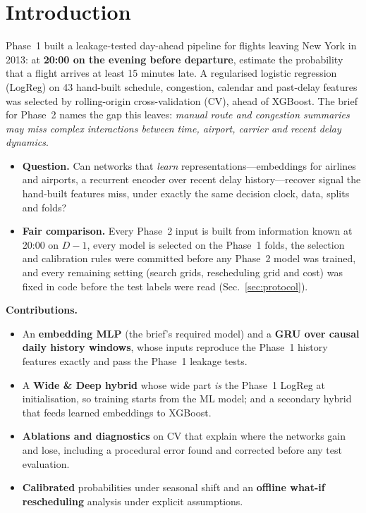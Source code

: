 \documentclass[conference]{IEEEtran}
\begin{document}
\section{Introduction}\label{sec:intro}
Phase~1 built a leakage-tested day-ahead pipeline for flights leaving New York in 2013: at \textbf{20:00 on the evening before departure}, estimate the probability that a flight arrives at least 15 minutes late. A regularised logistic regression (LogReg) on 43 hand-built schedule, congestion, calendar and past-delay features was selected by rolling-origin cross-validation (CV), ahead of XGBoost. The brief for Phase~2 names the gap this leaves: \emph{manual route and congestion summaries may miss complex interactions between time, airport, carrier and recent delay dynamics}.
\begin{itemize}
\item \textbf{Question.} Can networks that \emph{learn} representations---embeddings for airlines and airports, a recurrent encoder over recent delay history---recover signal the hand-built features miss, under exactly the same decision clock, data, splits and folds?
\item \textbf{Fair comparison.} Every Phase~2 input is built from information known at 20:00 on $D-1$, every model is selected on the Phase~1 folds, the selection and calibration rules were committed before any Phase~2 model was trained, and every remaining setting (search grids, rescheduling grid and cost) was fixed in code before the test labels were read (Sec.~\ref{sec:protocol}).
\end{itemize}

\textbf{Contributions.}
\begin{itemize}
\item An \textbf{embedding MLP} (the brief's required model) and a \textbf{GRU over causal daily history windows}, whose inputs reproduce the Phase~1 history features exactly and pass the Phase~1 leakage tests.
\item A \textbf{Wide \& Deep hybrid} whose wide part \emph{is} the Phase~1 LogReg at initialisation, so training starts from the ML model; and a secondary hybrid that feeds learned embeddings to XGBoost.
\item \textbf{Ablations and diagnostics} on CV that explain where the networks gain and lose, including a procedural error found and corrected before any test evaluation.
\item \textbf{Calibrated} probabilities under seasonal shift and an \textbf{offline what-if rescheduling} analysis under explicit assumptions.
\end{itemize}
\end{document}
